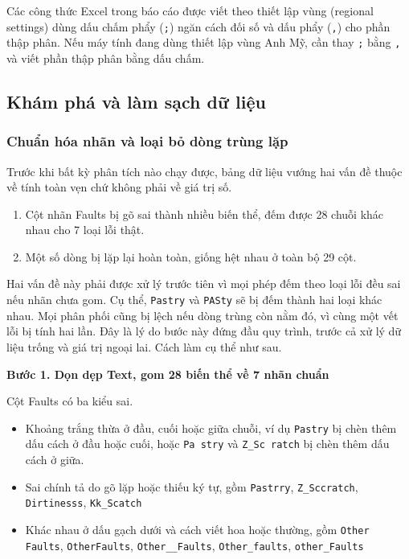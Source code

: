 \documentclass[12pt]{article}
\begin{document}
\begin{notebox}
Các công thức Excel trong báo cáo được viết theo thiết lập vùng (regional settings) dùng dấu chấm phẩy (\texttt{;}) ngăn cách đối số và dấu phẩy (\texttt{,}) cho phần thập phân. Nếu máy tính đang dùng thiết lập vùng Anh Mỹ, cần thay \texttt{;} bằng \texttt{,} và viết phần thập phân bằng dấu chấm.
\end{notebox}

\subsection{Khám phá và làm sạch dữ liệu}

\subsubsection{Chuẩn hóa nhãn và loại bỏ dòng trùng lặp}
Trước khi bất kỳ phân tích nào chạy được, bảng dữ liệu vướng hai vấn đề thuộc về tính toàn vẹn chứ không phải về giá trị số.
\begin{enumerate}
    \item Cột nhãn Faults bị gõ sai thành nhiều biến thể, đếm được 28 chuỗi khác nhau cho 7 loại lỗi thật.
    \item Một số dòng bị lặp lại hoàn toàn, giống hệt nhau ở toàn bộ 29 cột.
\end{enumerate}

\noindent Hai vấn đề này phải được xử lý trước tiên vì mọi phép đếm theo loại lỗi đều sai nếu nhãn chưa gom. Cụ thể, \texttt{Pastry} và \texttt{PASty} sẽ bị đếm thành hai loại khác nhau. Mọi phân phối cũng bị lệch nếu dòng trùng còn nằm đó, vì cùng một vết lỗi bị tính hai lần. Đây là lý do bước này đứng đầu quy trình, trước cả xử lý dữ liệu trống và giá trị ngoại lai. Cách làm cụ thể như sau.

\noindent \textbf{Bước 1. Dọn dẹp Text, gom 28 biến thể về 7 nhãn chuẩn}

\noindent Cột Faults có ba kiểu sai.
\begin{itemize}
  \item Khoảng trắng thừa ở đầu, cuối hoặc giữa chuỗi, ví dụ \texttt{Pastry} bị chèn thêm dấu cách ở đầu hoặc cuối, hoặc \texttt{Pa stry} và \texttt{Z\_Sc ratch} bị chèn thêm dấu cách ở giữa.
  \item Sai chính tả do gõ lặp hoặc thiếu ký tự, gồm \texttt{Pastrry}, \texttt{Z\_Sccratch}, \texttt{Dirtinesss}, \texttt{Kk\_Scatch}
  \item Khác nhau ở dấu gạch dưới và cách viết hoa hoặc thường, gồm \texttt{Other Faults}, \texttt{OtherFaults}, \texttt{Other\_\_Faults}, \texttt{Other\_faults}, \texttt{other\_Faults}
\end{itemize}
\end{document}
